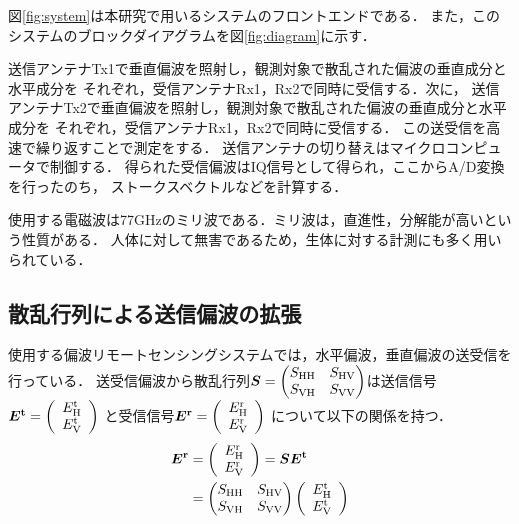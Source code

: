 \documentclass[uplatex,a4paper,12pt]{jsarticle}
\begin{document}
図\ref{fig:system}は本研究で用いるシステムのフロントエンドである．
また，このシステムのブロックダイアグラムを図\ref{fig:diagram}に示す．

送信アンテナTx1で垂直偏波を照射し，観測対象で散乱された偏波の垂直成分と水平成分を
それぞれ，受信アンテナRx1，Rx2で同時に受信する．次に，
送信アンテナTx2で垂直偏波を照射し，観測対象で散乱された偏波の垂直成分と水平成分を
それぞれ，受信アンテナRx1，Rx2で同時に受信する．
この送受信を高速で繰り返すことで測定をする．
送信アンテナの切り替えはマイクロコンピュータで制御する．
得られた受信偏波はIQ信号として得られ，ここからA/D変換を行ったのち，
ストークスベクトルなどを計算する．

使用する電磁波は77GHzのミリ波である．ミリ波は，直進性，分解能が高いという性質がある．
人体に対して無害であるため，生体に対する計測にも多く用いられている．

\subsection{散乱行列による送信偏波の拡張}
使用する偏波リモートセンシングシステムでは，水平偏波，垂直偏波の送受信を行っている．
送受信偏波から散乱行列$\bm{S} = 
\begin{pmatrix}
    S_{\rm{HH}} & S_{\rm{HV}} \\
    S_{\rm{VH}} & S_{\rm{VV}} \\
\end{pmatrix}
    $は送信信号$\bm{E^{\rm{t}}} =
\left(
    \begin{array}{c}
        E_{\rm{H}}^{\rm{t}}\\
        E_{\rm{V}}^{\rm{t}}
    \end{array}
\right)$
  と受信信号$\bm{E^{\rm{r}}} =
\left(
    \begin{array}{c}
        E_{\rm{H}}^{\rm{r}}\\
        E_{\rm{V}}^{\rm{r}}
    \end{array}
\right)$
  について以下の関係を持つ．
\begin{align}\label{equa:9}
    \bm{E^{\rm{r}}} &= 
    \left(
    \begin{array}{c}
        E_{\rm{H}}^{\rm{r}}\\
        E_{\rm{V}}^{\rm{r}}
    \end{array}
    \right)
     = \bm{S}\bm{E^{\rm{t}}} \\
     &=  
    \begin{pmatrix}
        S_{\rm{HH}} & S_{\rm{HV}} \\
        S_{\rm{VH}} & S_{\rm{VV}} \\
    \end{pmatrix}
    \left(
    \begin{array}{c}
        E_{\rm{H}}^{\rm{t}}\notag \\
        E_{\rm{V}}^{\rm{t}}
    \end{array}
    \right)
\end{align}
\end{document}
